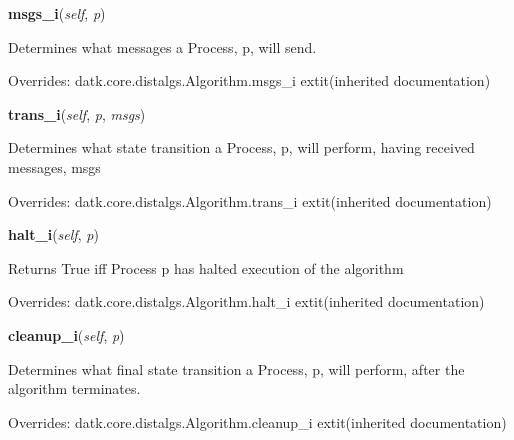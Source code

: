     \vspace{0.5ex}

\hspace{.8\funcindent}\begin{boxedminipage}{\funcwidth}

    \raggedright \textbf{msgs\_i}(\textit{self}, \textit{p})

\setlength{\parskip}{2ex}
    Determines what messages a Process, p, will send.

\setlength{\parskip}{1ex}
      Overrides: datk.core.distalgs.Algorithm.msgs\_i 	extit{(inherited documentation)}

    \end{boxedminipage}

    \vspace{0.5ex}

\hspace{.8\funcindent}\begin{boxedminipage}{\funcwidth}

    \raggedright \textbf{trans\_i}(\textit{self}, \textit{p}, \textit{msgs})

\setlength{\parskip}{2ex}
    Determines what state transition a Process, p, will perform, having 
    received messages, msgs

\setlength{\parskip}{1ex}
      Overrides: datk.core.distalgs.Algorithm.trans\_i 	extit{(inherited documentation)}

    \end{boxedminipage}

    \vspace{0.5ex}

\hspace{.8\funcindent}\begin{boxedminipage}{\funcwidth}

    \raggedright \textbf{halt\_i}(\textit{self}, \textit{p})

\setlength{\parskip}{2ex}
    Returns True iff Process p has halted execution of the algorithm

\setlength{\parskip}{1ex}
      Overrides: datk.core.distalgs.Algorithm.halt\_i 	extit{(inherited documentation)}

    \end{boxedminipage}

    \vspace{0.5ex}

\hspace{.8\funcindent}\begin{boxedminipage}{\funcwidth}

    \raggedright \textbf{cleanup\_i}(\textit{self}, \textit{p})

\setlength{\parskip}{2ex}
    Determines what final state transition a Process, p, will perform, 
    after the algorithm terminates.

\setlength{\parskip}{1ex}
      Overrides: datk.core.distalgs.Algorithm.cleanup\_i 	extit{(inherited documentation)}

    \end{boxedminipage}

